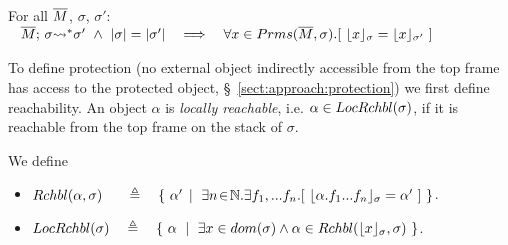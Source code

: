 

\begin{lemma}
\label{l:params:do:not:change} 
 
For all $\overline{M}$, $\sigma$, $\sigma'$:
 $\strut \hspace{0.3cm} \leadstoBoundedStar {\Mtwo}  {\sigma}  {\sigma'} \ \wedge  \ \DepthFs{\sigma}=\DepthFs {\sigma'}\ \ \ \Longrightarrow\ \  \ \forall x\in \Formals {\Mtwo} {\sigma}.[ \ \interpret \sigma x = \interpret {\sigma'} x \ ]$

\end{lemma}
 







To define protection (no external object indirectly accessible from the top frame
has access to the protected object, \cf \S~\ref{sect:approach:protection}) we first define
reachability. %
%  
%
An object
$\alpha$ is
 \emph{locally reachable}, i.e. $\alpha \in  LocRchbl(\sigma) $, if it is reachable from the top frame on the stack of $\sigma$.
 
\begin{definition} We define 
\begin{itemize}
\item
{{$\Relevant {\alpha} {\sigma}  \ \ \ \ \ \triangleq \ \  \  \{ \ \alpha' \, \mid \ \exists n\!\in\!\mathbb{N}.\exists f_1,...f_n. [\ \interpret {\sigma} {\alpha.f_1...f_n} = \alpha'\ ] \ \}$}}.
\item
$ \LRelevantO   \sigma  \ \  \ \triangleq \ \  \  \{ \ \alpha \ \mid \ { \exists x\in dom(\sigma) \wedge \alpha \in \Relevant {\interpret  {\sigma} x}
{\sigma} \ \} } $.
\end{itemize}
\end{definition}

